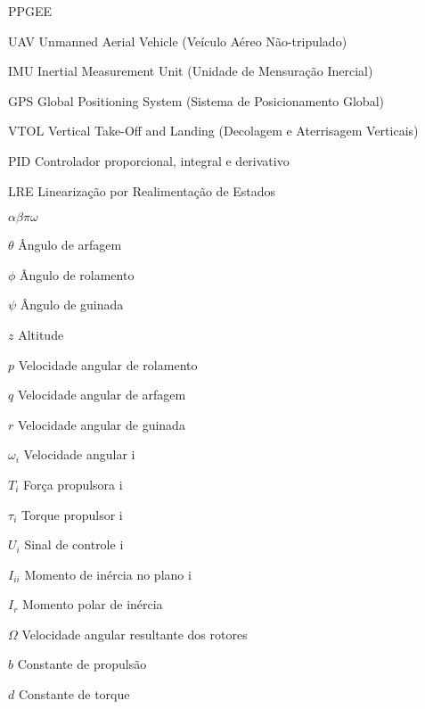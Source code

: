 \documentclass[main.tex]{subfiles}
\begin{document}
	
	\setcounter{tocdepth}{3}
	
	\listoffigures
	
	\listoftables
	
	\listofcodelist %
	
	\begin{listofabbrv}{PPGEE}
		\item[UAV] Unmanned Aerial Vehicle (Veículo Aéreo Não-tripulado)
		\item[IMU] Inertial Measurement Unit (Unidade de Mensuração Inercial)
		\item[GPS] Global Positioning System (Sistema de Posicionamento Global)
		\item[VTOL] Vertical Take-Off and Landing (Decolagem e Aterrisagem Verticais)
		\item[PID] Controlador proporcional, integral e derivativo
		\item[LRE] Linearização por Realimentação de Estados
	\end{listofabbrv}
	
	\begin{listofsymbols}{$\alpha\beta\pi\omega$}
		\item[$\theta$] Ângulo de arfagem
		\item[$\phi$] Ângulo de rolamento
		\item[$\psi$] Ângulo de guinada
		\item[$z$] Altitude
		\item[$p$] Velocidade angular de rolamento
		\item[$q$] Velocidade angular de arfagem
		\item[$r$] Velocidade angular de guinada
		\item[$\omega_i$] Velocidade angular i
		\item[$T_i$] Força propulsora i
		\item[$\tau_i$] Torque propulsor i
		\item[$U_i$] Sinal de controle i
		\item[$I_{ii}$] Momento de inércia no plano i
		\item[$I_{r}$] Momento polar de inércia
		\item[$\Omega$] Velocidade angular resultante dos rotores
		\item[$b$] Constante de propulsão
		\item[$d$] Constante de torque
	\end{listofsymbols}
	
	
	\tableofcontents
\end{document}
